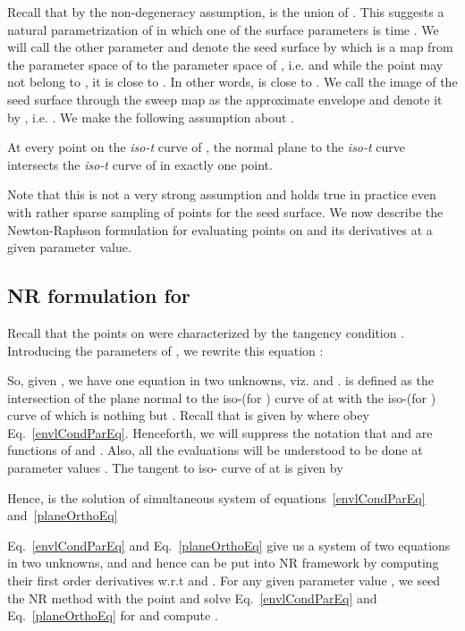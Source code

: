 \documentclass{elsart5p}
\begin{document}
Recall that by the non-degeneracy assumption,  is the union of .  This suggests a natural parametrization of  in 
which one of the surface parameters is time .  We will call the other parameter  and denote the seed surface by  which is a map 
from the parameter space of  to the parameter space of , i.e.  and while 
the point  may not belong to , it is close to .  In other words,  is close to .  
We call the image of the seed surface through the sweep map  as the approximate envelope and denote it by , 
i.e. .  We make the following assumption about .
\begin{assum} \label{oneOneAssum}
At every point on the \emph{iso-t} curve of , the normal plane to the \emph{iso-t} curve intersects the \emph{iso-t} curve of  in exactly one point.
\end{assum}
Note that this is not a very strong assumption and holds true in practice even with rather sparse sampling of points for the seed surface.  We now describe the Newton-Raphson formulation for evaluating points on  and its derivatives at a given parameter value.

\subsection{NR formulation for } \label{NRFormSubSec}

Recall that the points on  were characterized by the tangency condition .  
Introducing the parameters  of , we rewrite this equation :

So, given , we have one equation in two unknowns, viz.  and .  is defined as the 
intersection of the plane normal to the iso-(for ) curve of  at  with the iso-(for ) 
curve of  which is nothing but . Recall that  is given by  where  obey Eq.~\ref{envlCondParEq}.  
Henceforth, we will suppress the notation that  and  are functions of  and .  Also, all the evaluations will be 
understood to be done at parameter values .  The tangent to iso- curve of  at   is given by 

Hence,  is the solution of simultaneous system of equations~\ref{envlCondParEq} and~\ref{planeOrthoEq}

Eq.~\ref{envlCondParEq} and Eq.~\ref{planeOrthoEq} give us a system of two equations in two unknowns,  and  and hence can be put into NR 
framework by computing their first order derivatives w.r.t  and .  For any given parameter value , we seed the NR method with the 
point  and solve  Eq.~\ref{envlCondParEq} and Eq.~\ref{planeOrthoEq} for  and compute .
\end{document}
